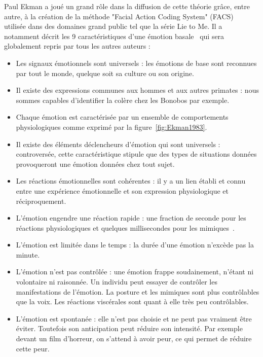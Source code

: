 Paul Ekman a joué un grand rôle dans la diffusion de cette théorie grâce, entre autre, à la création de la méthode "Facial Action Coding System" (FACS)~\cite{Ekman1978} utilisée dans des domaines grand public tel que la série Lie to Me. Il a notamment décrit les 9 caractéristiques d'une émotion basale~\cite{Ekman1992} qui sera globalement repris par tous les autres auteurs :
\begin{itemize}
  \item Les signaux émotionnels sont universels : les émotions de base sont reconnues par tout le monde, quelque soit sa culture ou son origine.
  \item Il existe des expressions communes aux hommes et aux autres primates : nous sommes capables d'identifier la colère chez les Bonobos par exemple.
  \item Chaque émotion est caractérisée par un ensemble de comportements physiologiques comme exprimé par la figure~\ref{fig:Ekman1983}.
  
  \item Il existe des éléments déclencheurs d'émotion qui sont universels : controversée, cette caractéristique stipule que des types de situations données provoqueront une émotion données chez tout sujet.
  \item Les réactions émotionnelles sont cohérentes : il y a un lien établi et connu entre une expérience émotionnelle et son expression physiologique et réciproquement.
  \item L'émotion engendre une réaction rapide : une fraction de seconde pour les réactions physiologiques et quelques millisecondes pour les mimiques~\cite{Ekman1978}.
  \item L'émotion est limitée dans le temps : la durée d'une émotion n'excède pas la minute.
  \item L'émotion n'est pas contrôlée : une émotion frappe soudainement, n'étant ni volontaire ni raisonnée. Un individu peut essayer de contrôler les manifestations de l'émotion. La posture et les mimiques sont plus contrôlables que la voix. Les réactions viscérales sont quant à elle très peu contrôlables.
  \item L'émotion est spontanée : elle n'est pas choisie et ne peut pas vraiment être éviter. Toutefois son anticipation peut réduire son intensité. Par exemple devant un film d'horreur, on s'attend à avoir peur, ce qui permet de réduire cette peur.
\end{itemize}



